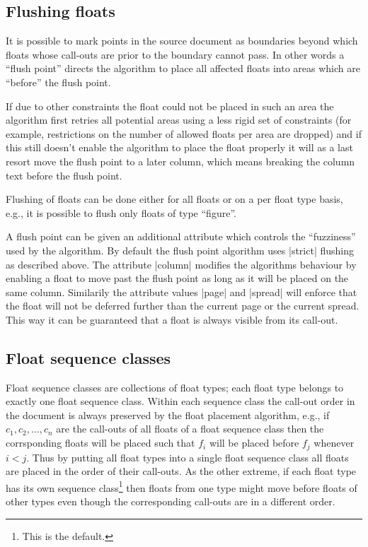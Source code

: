 \documentclass[twocolumn]{article}
\begin{document}
\subsection{Flushing floats}

It is possible to mark points in the source document as boundaries beyond
which floats whose call-outs are prior to the boundary cannot pass. In
other words a ``flush point'' directs the algorithm to place all
affected floats into areas which are ``before'' the flush point.

If due to other constraints the float could not be placed in such an
area the algorithm first retries all potential areas using a less
rigid set of constraints (for example, restrictions on the number of
allowed floats per area are dropped) and if this still doesn't enable
the algorithm to place the float properly it will as a last resort
move the flush point to a later column, which means breaking the
column text before the flush point.

Flushing of floats can be done either for all floats or on a
per float type basis, e.g., it is possible to flush only floats of
type ``figure''.

A flush point can be given an additional attribute which controls the
``fuzziness'' used by the algorithm. By default the flush point
algorithm uses |strict| flushing as described above. The attribute
|column| modifies the algorithms behaviour by enabling a float to move
past the flush point as long as it will be placed on the same
column. Similarily the attribute values |page| and |spread| will
enforce that the float will not be deferred further than the current
page or the current spread. This way it can be guaranteed that a float
is always visible from its call-out.


\subsection{Float sequence classes}

Float sequence classes are collections of float types; each float type
belongs to exactly one float sequence class. Within each sequence
class the call-out order in the document is always preserved by the
float placement algorithm, e.g., if $c_1,c_2,\ldots,c_n$ are the
call-outs of all floats of a float sequence class then the
corrsponding floats will be placed such that $f_i$ will be placed
before $f_j$ whenever $i<j$.  Thus by putting all float types into a
single float sequence class all floats are placed in the order of
their call-outs. As the other extreme, if each float type has its own
sequence class\footnote{This is the \LaTeXe{} default.} then floats
from one type might move before floats of other types even though the
corresponding call-outs are in a different order.
\end{document}
